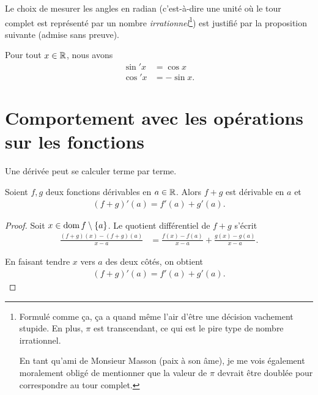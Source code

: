 \documentclass[main.tex]{subfiles}
\begin{document}
Le choix de mesurer les angles en radian
(c'est-à-dire une unité où le tour complet est représenté par un nombre \emph{irrationnel}\footnote{%
    Formulé comme ça, ça a quand même l'air d'être une décision vachement stupide.
    En plus, $\pi$ est transcendant, ce qui est le pire type de nombre irrationnel.

    En tant qu'ami de Monsieur Masson (paix à son âme),
    je me vois également moralement obligé de mentionner
    que la valeur de $\pi$ devrait être doublée pour correspondre au tour complet.
})
est justifié par la proposition suivante (admise sans preuve).

\begin{proposition}

    Pour tout $x \in \mathbb{R}$,
    nous avons
    \begin{align}
        \sin' x &= \cos x\\
        \cos' x &= -\sin x.
    \end{align}
\end{proposition}

\section{Comportement avec les opérations sur les fonctions}

Une dérivée peut se calculer terme par terme.

\begin{proposition}

    Soient $f, g$ deux fonctions dérivables en $a \in \mathbb{R}$.
    Alors $f + g$ est dérivable en $a$ et
    \begin{align}
        (f + g)'(a) = f'(a) + g'(a).
    \end{align}
\end{proposition}
\begin{proof}
    Soit $x \in \operatorname{dom} f \setminus \{a\}$.
    Le quotient différentiel de $f + g$ s'écrit
    \begin{align}
        \frac {(f + g)(x) - (f + g)(a)} {x - a}
        &= \frac {f(x) - f(a)} {x - a} + \frac {g(x) - g(a)} {x - a}.
    \end{align}

    En faisant tendre $x$ vers $a$ des deux côtés,
    on obtient
    \begin{align}
        (f + g)'(a) = f'(a) + g'(a).
    \end{align}
\end{proof}
\end{document}
